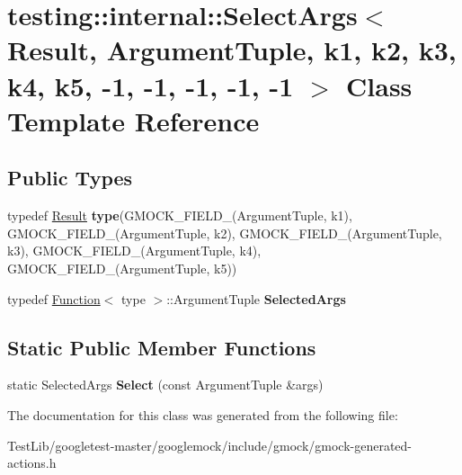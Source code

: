 \hypertarget{classtesting_1_1internal_1_1SelectArgs_3_01Result_00_01ArgumentTuple_00_01k1_00_01k2_00_01k3_00_dabb861d0dfd59e876e4adc8d7e61c25}{}\section{testing\+:\+:internal\+:\+:Select\+Args$<$ Result, Argument\+Tuple, k1, k2, k3, k4, k5, -\/1, -\/1, -\/1, -\/1, -\/1 $>$ Class Template Reference}
\label{classtesting_1_1internal_1_1SelectArgs_3_01Result_00_01ArgumentTuple_00_01k1_00_01k2_00_01k3_00_dabb861d0dfd59e876e4adc8d7e61c25}
\subsection*{Public Types}
\begin{DoxyCompactItemize}
\item 
\mbox{\label{classtesting_1_1internal_1_1SelectArgs_3_01Result_00_01ArgumentTuple_00_01k1_00_01k2_00_01k3_00_dabb861d0dfd59e876e4adc8d7e61c25_a64b825d66ab0457b44e260b2fd7e1946}} 
typedef \hyperlink{classResult}{Result} {\bfseries type}(G\+M\+O\+C\+K\+\_\+\+F\+I\+E\+L\+D\+\_\+(Argument\+Tuple, k1), G\+M\+O\+C\+K\+\_\+\+F\+I\+E\+L\+D\+\_\+(Argument\+Tuple, k2), G\+M\+O\+C\+K\+\_\+\+F\+I\+E\+L\+D\+\_\+(Argument\+Tuple, k3), G\+M\+O\+C\+K\+\_\+\+F\+I\+E\+L\+D\+\_\+(Argument\+Tuple, k4), G\+M\+O\+C\+K\+\_\+\+F\+I\+E\+L\+D\+\_\+(Argument\+Tuple, k5))
\item 
\mbox{\label{classtesting_1_1internal_1_1SelectArgs_3_01Result_00_01ArgumentTuple_00_01k1_00_01k2_00_01k3_00_dabb861d0dfd59e876e4adc8d7e61c25_adc02f2ce0bec0329a74a88e01a586ca1}} 
typedef \hyperlink{structtesting_1_1internal_1_1Function}{Function}$<$ type $>$\+::Argument\+Tuple {\bfseries Selected\+Args}
\end{DoxyCompactItemize}
\subsection*{Static Public Member Functions}
\begin{DoxyCompactItemize}
\item 
\mbox{\label{classtesting_1_1internal_1_1SelectArgs_3_01Result_00_01ArgumentTuple_00_01k1_00_01k2_00_01k3_00_dabb861d0dfd59e876e4adc8d7e61c25_a08f454a7721b19e327042fd2bb6bf36f}} 
static Selected\+Args {\bfseries Select} (const Argument\+Tuple \&args)
\end{DoxyCompactItemize}


The documentation for this class was generated from the following file\+:\begin{DoxyCompactItemize}
\item 
Test\+Lib/googletest-\/master/googlemock/include/gmock/gmock-\/generated-\/actions.\+h\end{DoxyCompactItemize}
